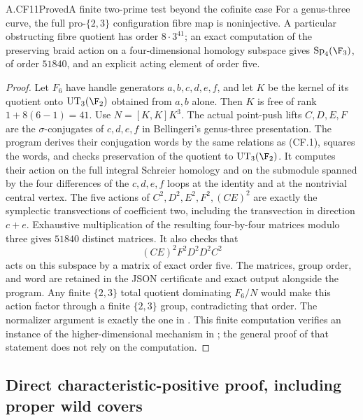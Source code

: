 \begin{claim}{A.CF11}{Proved}{A finite two-prime test beyond the cofinite case}
For a genus-three curve, the full pro-$\{2,3\}$ configuration fibre
map is noninjective. A particular obstructing fibre quotient has order
$8\cdot3^{41}$; an exact computation of the preserving braid action
on a four-dimensional homology subspace gives
$\operatorname{Sp}_4(\F_3)$, of order $51840$, and an explicit
acting element of order five.
\end{claim}
\begin{proof}
Let $F_6$ have handle generators $a,b,c,d,e,f$, and let $K$ be the
kernel of its quotient onto $\operatorname{UT}_3(\F_2)$ obtained
from $a,b$ alone. Then $K$ is free of rank $1+8(6-1)=41$.
Use $N=[K,K]K^3$. The actual point-push lifts
$C,D,E,F$ are the $\sigma$-conjugates of $c,d,e,f$ in Bellingeri's
genus-three presentation. The program
 derives their
conjugation words by the same relations as (CF.1), squares the words,
and checks preservation of the quotient to $\operatorname{UT}_3(\F_2)$.
It computes their action on the full integral Schreier homology and
on the submodule spanned by the four differences of the $c,d,e,f$
loops at the identity and at the nontrivial central vertex.
The five actions of $C^2,D^2,E^2,F^2,(CE)^2$ are exactly the
symplectic transvections of coefficient two, including the
transvection in direction $c+e$. Exhaustive multiplication of the
resulting four-by-four matrices modulo three gives $51840$ distinct
matrices. It also checks that
\[
                    (CE)^2 F^2 D^2 D^2 C^2
\]
acts on this subspace by a matrix of exact order five.
The matrices, group order, and word are retained in the JSON
certificate and exact output alongside the program. Any finite
$\{2,3\}$ total quotient dominating $F_6/N$ would make this action
factor through a finite $\{2,3\}$ group, contradicting that order.
The normalizer argument is exactly the one in
. This finite computation verifies an instance
of the higher-dimensional mechanism in ; the
general proof of that statement does not rely on the computation.
\end{proof}

\subsection{Direct characteristic-positive proof, including proper wild covers}

